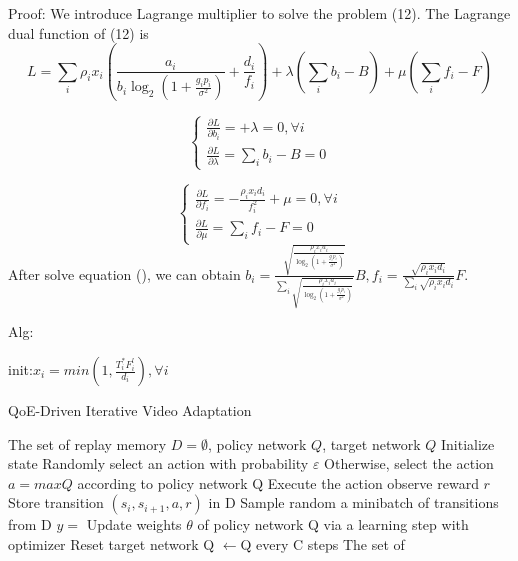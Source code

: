 \documentclass{article}
\begin{document}
Proof:
We introduce Lagrange multiplier to solve the problem (12). The Lagrange dual function of (12) is
\begin{equation}
L=\sum_{i}\rho_{i}x_{i}(\frac{a_{i}}{b_{i}\log_{2}{ (1+\frac{g_{i}p_{i}}{ \sigma^{2} } )} }+\frac{d_{i}}{f_{i}}) + \lambda(\sum_{i}b_{i}-B) + \mu(\sum_{i}f_{i}-F)
\end{equation}

\begin{equation}
	\left\{
	\begin{array}{ll}   
	\frac{\partial L}{\partial b_{i}} =  + \lambda = 0, \forall i \\
    \frac{\partial L}{\partial \lambda} = \sum_{i}b_{i} - B = 0
	\end{array}
\right.
\end{equation}

\begin{equation}
	\left\{
	\begin{array}{ll}   
	\frac{\partial L}{\partial f_{i}} = -\frac{\rho_{i}x_{i}d_{i}}{f_{i}^{2}} + \mu = 0, \forall i \\
    \frac{\partial L}{\partial \mu} = \sum_{i}f_{i} - F = 0
	\end{array}
\right.
\end{equation}
After solve equation (), we can obtain $b_{i}=\frac{\sqrt{\frac{\rho_{i}x_{i}a_{i}}{\log_{2}{ (1+\frac{g_{i}p_{i}}{ \sigma^{2} } )} }}}{\sum_{i}\sqrt{\frac{\rho_{i}x_{i}a_{i}}{\log_{2}{ (1+\frac{g_{i}p_{i}}{ \sigma^{2} } )} }}}B, f_{i}=\frac{ \sqrt{ \rho_{i}x_{i}d_{i}} } { \sum_{i}\sqrt{\rho_{i}x_{i}d_{i}} }F$.

Alg:

init:$x_{i}= min(1,\frac{T^{*}_{i}F_{i}^{l}}{d_{i}}), \forall i$

\begin{algorithm}[t]
  \renewcommand{\algorithmicrequire}{\textbf{Input:}}
  \renewcommand{\algorithmicensure}{\textbf{Initialization:}}
  \small
  \caption{QoE-Driven Iterative Video Adaptation}
  \label{alg:intra_place}
  \begin{algorithmic}[1]
  	\REQUIRE The set of
  	\ENSURE replay memory $D=\emptyset$, policy network $Q$, target network $Q$
  		\STATE Initialize state
  			\STATE Randomly select an action with probability $\varepsilon$
  			\STATE Otherwise, select the action $a=maxQ$ according to policy network Q
  			\STATE Execute the action observe reward $r$
  			\STATE Store transition $(s_{i},s_{i+1}, a, r)$ in D
  			\STATE Sample random a minibatch of transitions from D
  			\STATE $y=$
  			\STATE Update weights $\theta$ of policy network Q via a learning step with optimizer
  			\STATE Reset target network Q $\leftarrow$Q every C steps
  		\ENDWHILE
  	\ENDFOR
  	\renewcommand{\algorithmicensure}{\textbf{Output:}}
	\ENSURE The set of
  \end{algorithmic}
\end{algorithm}
\end{document}
